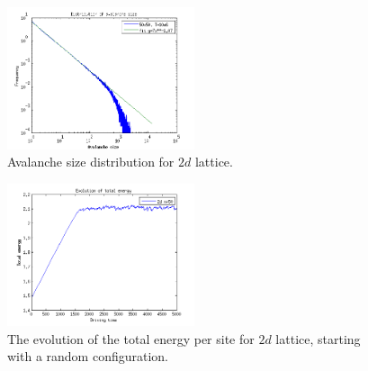 \begin{figure} 
\begin{center}
\includegraphics[width=0.49\textwidth]{results/2dsfit.png}
\caption{Avalanche size distribution for $2d$ lattice. }
\label{sfit}
\end{center}
\end{figure} 

\begin{figure} 
\begin{center}
\includegraphics[width=0.49\textwidth]{results/2e.png}
\caption{The evolution of the total energy per site for $2d$ lattice, starting with a random configuration. }
\label{2e}
\end{center}
\end{figure} 

